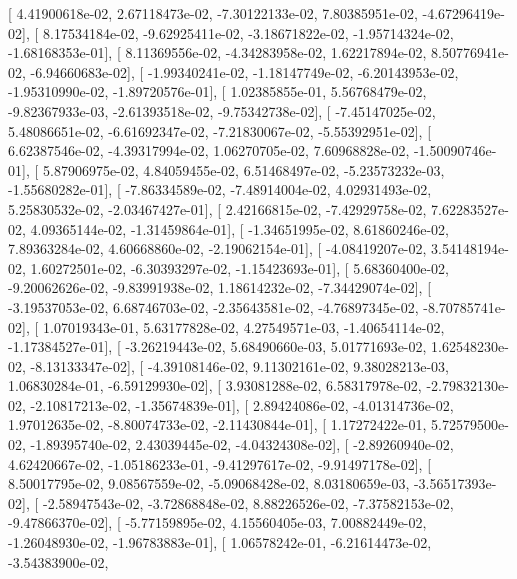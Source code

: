 \documentclass{article}
\begin{document}
       [  4.41900618e-02,   2.67118473e-02,  -7.30122133e-02,
          7.80385951e-02,  -4.67296419e-02],
       [  8.17534184e-02,  -9.62925411e-02,  -3.18671822e-02,
         -1.95714324e-02,  -1.68168353e-01],
       [  8.11369556e-02,  -4.34283958e-02,   1.62217894e-02,
          8.50776941e-02,  -6.94660683e-02],
       [ -1.99340241e-02,  -1.18147749e-02,  -6.20143953e-02,
         -1.95310990e-02,  -1.89720576e-01],
       [  1.02385855e-01,   5.56768479e-02,  -9.82367933e-03,
         -2.61393518e-02,  -9.75342738e-02],
       [ -7.45147025e-02,   5.48086651e-02,  -6.61692347e-02,
         -7.21830067e-02,  -5.55392951e-02],
       [  6.62387546e-02,  -4.39317994e-02,   1.06270705e-02,
          7.60968828e-02,  -1.50090746e-01],
       [  5.87906975e-02,   4.84059455e-02,   6.51468497e-02,
         -5.23573232e-03,  -1.55680282e-01],
       [ -7.86334589e-02,  -7.48914004e-02,   4.02931493e-02,
          5.25830532e-02,  -2.03467427e-01],
       [  2.42166815e-02,  -7.42929758e-02,   7.62283527e-02,
          4.09365144e-02,  -1.31459864e-01],
       [ -1.34651995e-02,   8.61860246e-02,   7.89363284e-02,
          4.60668860e-02,  -2.19062154e-01],
       [ -4.08419207e-02,   3.54148194e-02,   1.60272501e-02,
         -6.30393297e-02,  -1.15423693e-01],
       [  5.68360400e-02,  -9.20062626e-02,  -9.83991938e-02,
          1.18614232e-02,  -7.34429074e-02],
       [ -3.19537053e-02,   6.68746703e-02,  -2.35643581e-02,
         -4.76897345e-02,  -8.70785741e-02],
       [  1.07019343e-01,   5.63177828e-02,   4.27549571e-03,
         -1.40654114e-02,  -1.17384527e-01],
       [ -3.26219443e-02,   5.68490660e-03,   5.01771693e-02,
          1.62548230e-02,  -8.13133347e-02],
       [ -4.39108146e-02,   9.11302161e-02,   9.38028213e-03,
          1.06830284e-01,  -6.59129930e-02],
       [  3.93081288e-02,   6.58317978e-02,  -2.79832130e-02,
         -2.10817213e-02,  -1.35674839e-01],
       [  2.89424086e-02,  -4.01314736e-02,   1.97012635e-02,
         -8.80074733e-02,  -2.11430844e-01],
       [  1.17272422e-01,   5.72579500e-02,  -1.89395740e-02,
          2.43039445e-02,  -4.04324308e-02],
       [ -2.89260940e-02,   4.62420667e-02,  -1.05186233e-01,
         -9.41297617e-02,  -9.91497178e-02],
       [  8.50017795e-02,   9.08567559e-02,  -5.09068428e-02,
          8.03180659e-03,  -3.56517393e-02],
       [ -2.58947543e-02,  -3.72868848e-02,   8.88226526e-02,
         -7.37582153e-02,  -9.47866370e-02],
       [ -5.77159895e-02,   4.15560405e-03,   7.00882449e-02,
         -1.26048930e-02,  -1.96783883e-01],
       [  1.06578242e-01,  -6.21614473e-02,  -3.54383900e-02,
\end{document}
